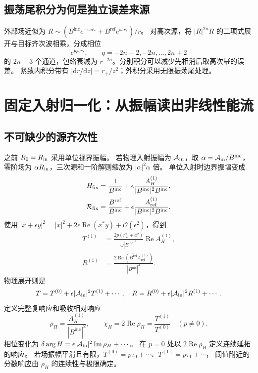 \documentclass[UTF8,fontset=fandol,11pt,a4paper]{ctexart}
\newcommand{\ii}{\mathrm{i}}
\newcommand{\dd}{\mathrm{d}}
\newcommand{\Rea}{\operatorname{Re}}
\newcommand{\Ima}{\operatorname{Im}}
\newcommand{\Bin}{B^{\mathrm{inc}}}
\newcommand{\Bref}{B^{\mathrm{ref}}}
\newcommand{\AH}{A_H^{(1)}}
\newcommand{\Aref}{A_{\mathrm{ref}}^{(1)}}
\newcommand{\calO}{\mathcal O}
\numberwithin{equation}{section}
\begin{document}
\subsection{振荡尾积分为何是独立误差来源}
外部场近似为 $R\sim(\Bin e^{-\ii\omega r_*}+\Bref e^{\ii\omega r_*})/r$。
对高次源，将 $|R|^{2n}R$ 的二项式展开与目标齐次波相乘，分成相位
\begin{equation}
e^{\ii q\omega r_*},\qquad q=-2n-2,-2n,\ldots,2n+2
\end{equation}
的 $2n+3$ 个通道，包络衰减为 $r^{-2n}$。分别积分可以减少先相消后取高次幂的误差。
紧致内积分带有 $|\dd r/\dd z|=r_+/z^2$；外积分采用无限振荡尾处理。

\section{固定入射归一化：从振幅读出非线性能流}
\subsection{不可缺少的源齐次性}
之前 $R_0=R_{\rm in}$ 采用单位视界振幅。
若物理入射振幅为 $\mathcal A_{\rm in}$，取 $\alpha=\mathcal A_{\rm in}/\Bin$，
零阶场为 $\alpha R_{\rm in}$，三次源和一阶解则缩放为 $|\alpha|^2\alpha$ 倍。
单位入射时边界振幅变成
\begin{align}
H_{\rm fix}&=\frac1{\Bin}+\epsilon\frac{\AH}{|\Bin|^2\Bin},\\
\mathcal R_{\rm fix}&=\frac{\Bref}{\Bin}+\epsilon\frac{\Aref}{|\Bin|^2\Bin}.
\end{align}
使用 $|x+\epsilon y|^2=|x|^2+2\epsilon\Rea(x^*y)+\calO(\epsilon^2)$，得到
\begin{align}
T^{(1)}&=\frac{2p(r_+^2+a^2)}{\omega|\Bin|^4}\Rea\AH,\\
R^{(1)}&=\frac{2\Rea(\overline{\Bref}\Aref)}{|\Bin|^4}.
\end{align}
物理展开则是
\begin{equation}
T=T^{(0)}+\epsilon|\mathcal A_{\rm in}|^2T^{(1)}+\cdots,
\quad R=R^{(0)}+\epsilon|\mathcal A_{\rm in}|^2R^{(1)}+\cdots.
\end{equation}
定义完整复响应和吸收相对响应
\begin{equation}
\rho_H=\frac{\AH}{|\Bin|^2},\qquad
\chi_H=2\Rea\rho_H=\frac{T^{(1)}}{T^{(0)}}\quad(p\ne0).
\end{equation}
相位变化为 $\delta\arg H=\epsilon|\mathcal A_{\rm in}|^2\Ima\rho_H+\cdots$。
在 $p=0$ 处以 $2\Rea\rho_H$ 定义连续延拓的响应。
若场振幅平滑且有限，$T^{(0)}=p\tau_0+\cdots$、$T^{(1)}=p\tau_1+\cdots$，
阈值附近的分数响应由 $\rho_H$ 的连续性与极限确定。
\end{document}
